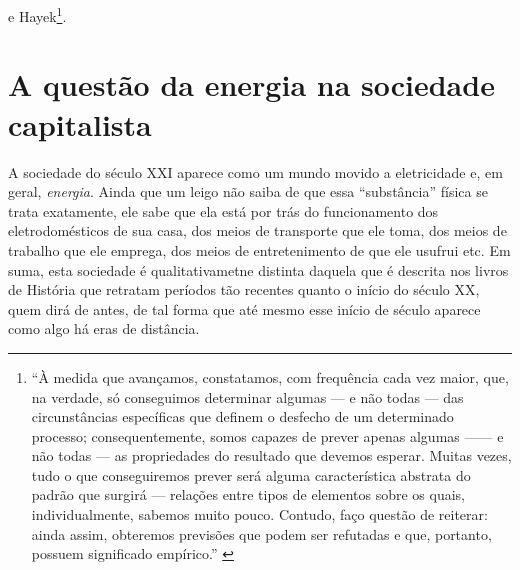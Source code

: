  e Hayek\footnote{``À medida que avançamos, constatamos, com frequência cada vez maior, que, na verdade, só conseguimos determinar algumas --- e não todas --- das circunstâncias específicas que definem o desfecho de um determinado processo; consequentemente, somos capazes de prever apenas algumas ---— e não todas --- as propriedades do resultado que devemos esperar. Muitas vezes, tudo o que conseguiremos prever será alguma característica abstrata do padrão que surgirá --- relações entre tipos de elementos sobre os quais, individualmente, sabemos muito pouco. Contudo, faço questão de reiterar: ainda assim, obteremos previsões que podem ser refutadas e que, portanto, possuem significado empírico.'' \parencite{Hayek1975}}. 


\section{A questão da energia na sociedade capitalista}
A sociedade do século XXI aparece como um mundo movido a eletricidade e, em geral, \textit{energia}. Ainda que um leigo não saiba de que essa ``substância'' física se trata exatamente, ele sabe que ela está por trás do funcionamento dos eletrodomésticos de sua casa, dos meios de transporte que ele toma, dos meios de trabalho que ele emprega, dos meios de entretenimento de que ele usufrui etc. Em suma, esta sociedade é qualitativametne distinta daquela que é descrita nos livros de História que retratam períodos tão recentes quanto o início do século XX, quem dirá de antes, de tal forma que até mesmo esse início de século aparece como algo há eras de distância. 

